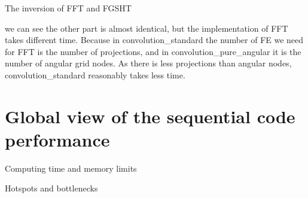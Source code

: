 The inversion of FFT and FGSHT

we can see the other part is almost identical, but the implementation
of FFT takes different time. Because in convolution\_standard the
number of FE we need for FFT is the number of projections, and in
convolution\_pure\_angular it is the number of angular grid nodes.
As there is less projections than angular nodes, convolution\_standard
reasonably takes less time.


\section{Global view of the sequential code performance}

Computing time and memory limits

Hotspots and bottlenecks
